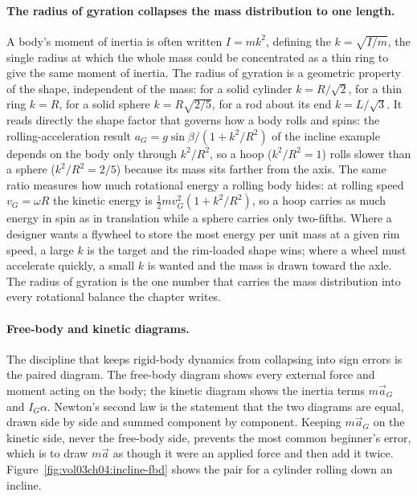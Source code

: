 \paragraph{The radius of gyration collapses the mass distribution to one
length.} A body's moment of inertia is often written $I=mk^{2}$, defining
the  $k=\sqrt{I/m}$, the single radius at
which the whole mass could be concentrated as a thin ring to give the
same moment of inertia. The radius of gyration is a geometric property of
the shape, independent of the mass: for a solid cylinder $k=R/\sqrt{2}$,
for a thin ring $k=R$, for a solid sphere $k=R\sqrt{2/5}$, for a rod
about its end $k=L/\sqrt{3}$. It reads directly the shape factor that
governs how a body rolls and spins: the rolling-acceleration result
$a_{G}=g\sin\beta/(1+k^{2}/R^{2})$ of the incline example depends on the
body only through $k^{2}/R^{2}$, so a hoop ($k^{2}/R^{2}=1$) rolls slower
than a sphere ($k^{2}/R^{2}=2/5$) because its mass sits farther from the
axis. The same ratio measures how much rotational energy a rolling body
hides: at rolling speed $v_{G}=\omega R$ the kinetic energy is
$\tfrac{1}{2}mv_{G}^{2}(1+k^{2}/R^{2})$, so a hoop carries as much energy in
spin as in translation while a sphere carries only two-fifths.
Where a designer wants a flywheel to store the most energy per unit mass
at a given rim speed, a large $k$ is the target and the rim-loaded shape
wins; where a wheel must accelerate quickly, a small $k$ is wanted and
the mass is drawn toward the axle. The radius of gyration is the one
number that carries the mass distribution into every rotational balance
the chapter writes.

\paragraph{Free-body and kinetic diagrams.} The discipline that keeps
rigid-body dynamics from collapsing into sign errors is the paired
diagram. The free-body diagram shows every external force and moment
acting on the body; the kinetic diagram shows the inertia terms
$m\vec{a}_{G}$ and $I_{G}\alpha$. Newton's second law is the statement
that the two diagrams are equal, drawn side by side and summed
component by component. Keeping $m\vec{a}_{G}$ on the kinetic side,
never the free-body side, prevents the most common beginner's error,
which is to draw $m\vec{a}$ as though it were an applied force and then
add it twice. Figure~\ref{fig:vol03ch04:incline-fbd} shows the pair
for a cylinder rolling down an incline.

